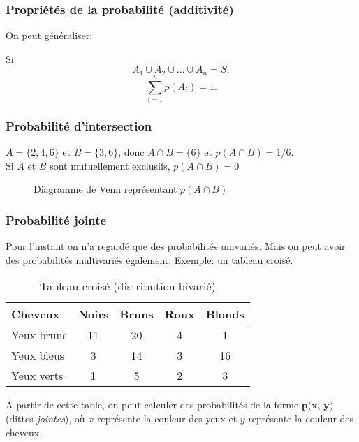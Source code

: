 \documentclass{beamer}
\begin{document}
\begin{frame}
    \frametitle{Propriétés de la probabilité (additivité)}
    On peut généraliser:

    \pause

    \vfill

    Si 
    \[A_1 \cup A_2 \cup \ldots \cup A_n = S,\]
    \[\sum_{i=1}^{n} p(A_i) = 1.\]
\end{frame}




\begin{frame}
    \frametitle{Probabilité d'intersection}
    $A = \{2,4,6\}$ et $B = \{3,6\}$, donc $A \cap B = \{6\}$ et $p(A \cap B) = 1/6$.\\
    \vfill
    \pause
    Si $A$ et $B$ sont mutuellement exclusifs, $p(A \cap B) = 0$    
    \begin{figure}
      \centering
      
      \caption{Diagramme de Venn représentant $p(A \cap B)$}
    \end{figure}
\end{frame}


\begin{frame}
    \frametitle{Probabilité jointe}
    Pour l'instant on n'a regardé que des probabilités univariés. Mais on peut avoir des probabilités multivariés également.
    Exemple: un tableau croisé.
    \pause
    \begin{table}[h!]
      \centering
      \begin{tabular}{|l|c|c|c|c|}
        \hline
        Cheveux & Noirs & Bruns & Roux & Blonds \\
        \hline\hline
        Yeux bruns & 11 & 20 & 4 & 1 \\
        Yeux bleus & 3 & 14 & 3 & 16 \\
        Yeux verts & 1 & 5 & 2 & 3 \\
        \hline
      \end{tabular}
      \caption{Tableau croisé (distribution bivarié)}
    \end{table}
    \pause
    A partir de cette table, on peut calculer des probabilités de la forme $\textbf{p(x, y)}$ (dittes \emph{jointes}),
    où $x$ représente la couleur des yeux et $y$ représente la couleur des cheveux.
\end{frame}
\end{document}
